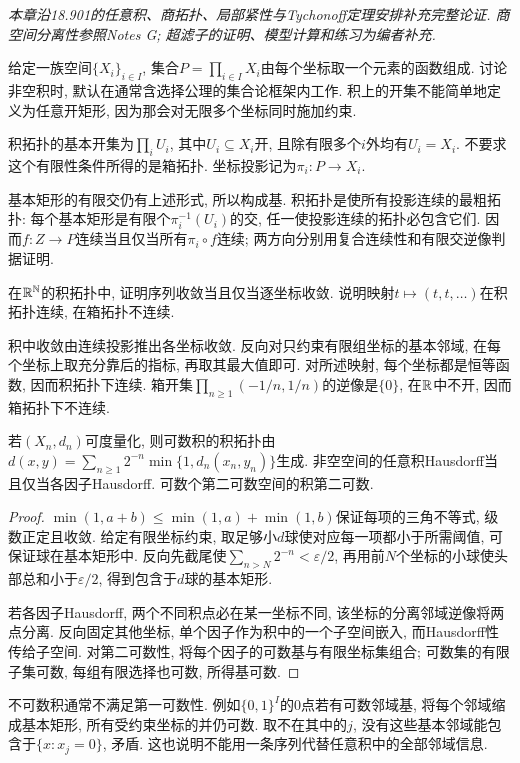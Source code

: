 \label{ch:products}
\emph{本章沿18.901的任意积、商拓扑、局部紧性与Tychonoff定理安排补充完整论证. 商空间分离性参照Notes G; 超滤子的证明、模型计算和练习为编者补充.}

给定一族空间$\{X_i\}_{i\in I}$, 集合$P=\prod_{i\in I}X_i$由每个坐标取一个元素的函数组成. 讨论非空积时, 默认在通常含选择公理的集合论框架内工作. 积上的开集不能简单地定义为任意开矩形, 因为那会对无限多个坐标同时施加约束.
\begin{definition}
积拓扑的基本开集为$\prod_iU_i$, 其中$U_i\subseteq X_i$开, 且除有限多个$i$外均有$U_i=X_i$. 不要求这个有限性条件所得的是箱拓扑. 坐标投影记为$\pi_i:P\to X_i$.
\end{definition}
基本矩形的有限交仍有上述形式, 所以构成基. 积拓扑是使所有投影连续的最粗拓扑: 每个基本矩形是有限个$\pi_i^{-1}(U_i)$的交, 任一使投影连续的拓扑必包含它们. 因而$f:Z\to P$连续当且仅当所有$\pi_i\circ f$连续; 两方向分别用复合连续性和有限交逆像判据证明.

\begin{example}
在$\mathbb R^{\mathbb N}$的积拓扑中, 证明序列收敛当且仅当逐坐标收敛. 说明映射$t\mapsto(t,t,\ldots)$在积拓扑连续, 在箱拓扑不连续.
\end{example}
\begin{solution}
积中收敛由连续投影推出各坐标收敛. 反向对只约束有限组坐标的基本邻域, 在每个坐标上取充分靠后的指标, 再取其最大值即可. 对所述映射, 每个坐标都是恒等函数, 因而积拓扑下连续. 箱开集$\prod_{n\ge1}(-1/n,1/n)$的逆像是$\{0\}$, 在$\mathbb R$中不开, 因而箱拓扑下不连续.
\end{solution}

\begin{proposition}\label{thm:countable-product-metric}
若$(X_n,d_n)$可度量化, 则可数积的积拓扑由
$d(x,y)=\sum_{n\ge1}2^{-n}\min\{1,d_n(x_n,y_n)\}$生成. 非空空间的任意积Hausdorff当且仅当各因子Hausdorff. 可数个第二可数空间的积第二可数.
\end{proposition}
\begin{proof}
$\min(1,a+b)\le\min(1,a)+\min(1,b)$保证每项的三角不等式, 级数正定且收敛. 给定有限坐标约束, 取足够小$d$球使对应每一项都小于所需阈值, 可保证球在基本矩形中. 反向先截尾使$\sum_{n>N}2^{-n}<\varepsilon/2$, 再用前$N$个坐标的小球使头部总和小于$\varepsilon/2$, 得到包含于$d$球的基本矩形.

若各因子Hausdorff, 两个不同积点必在某一坐标不同, 该坐标的分离邻域逆像将两点分离. 反向固定其他坐标, 单个因子作为积中的一个子空间嵌入, 而Hausdorff性传给子空间. 对第二可数性, 将每个因子的可数基与有限坐标集组合; 可数集的有限子集可数, 每组有限选择也可数, 所得基可数.
\end{proof}
不可数积通常不满足第一可数性. 例如$\{0,1\}^I$的$0$点若有可数邻域基, 将每个邻域缩成基本矩形, 所有受约束坐标的并仍可数. 取不在其中的$j$, 没有这些基本邻域能包含于$\{x:x_j=0\}$, 矛盾. 这也说明不能用一条序列代替任意积中的全部邻域信息.

